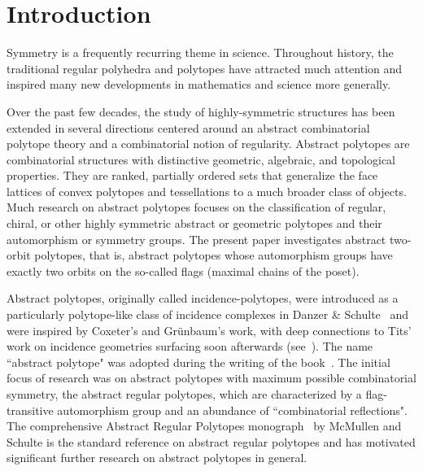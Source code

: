 \documentclass[12pt]{article}
\renewcommand{\>}{\rangle}
\theoremstyle{definition}\newtheorem{definition}{Definition}[section]
\begin{document}
\section{Introduction}
\label{intro}
Symmetry is a frequently recurring theme in science. 
Throughout history, the traditional regular polyhedra and polytopes have attracted much attention and inspired many new developments in mathematics and science more generally. 

Over the past few decades, the study of highly-symmetric structures has been extended in several directions centered around an abstract combinatorial polytope theory and a combinatorial notion of regularity. Abstract polytopes are combinatorial structures with distinctive geometric, algebraic, and topological properties. 
They are ranked, partially ordered sets that generalize the face lattices of convex polytopes and tessellations to a much broader class of objects. Much research on abstract polytopes focuses on the classification of regular, chiral, or other highly symmetric abstract or geometric polytopes and their automorphism or symmetry groups. The present paper  investigates abstract two-orbit polytopes, that is, abstract polytopes whose automorphism groups have exactly two orbits on the so-called flags (maximal chains of the poset).

Abstract polytopes, originally called incidence-polytopes, were introduced as a particularly polytope-like class of incidence complexes in Danzer \& Schulte~\cite{DS1982} and were inspired by Coxeter's and Gr\"unbaum's work, with deep connections to Tits' work on incidence geometries surfacing soon afterwards (see~\cite{C1973,C1991,G1977b,G2003,T1961,T1974}). The name ``abstract polytope" was adopted during the writing of the book~\cite{MS2002}. The initial focus of research was on abstract polytopes with maximum possible combinatorial symmetry, the abstract regular polytopes, which are characterized by a flag-transitive automorphism group and an abundance of ``combinatorial reflections". The comprehensive Abstract Regular Polytopes monograph~\cite{MS2002} by McMullen and Schulte is the standard reference on abstract regular polytopes and has motivated significant further research on abstract polytopes in general. 
\end{document}
